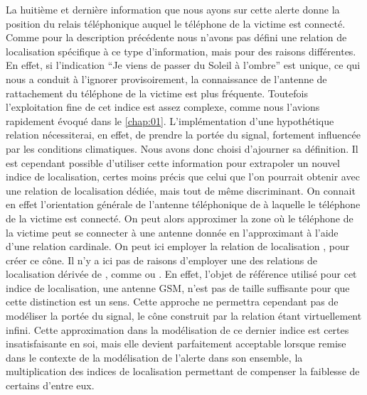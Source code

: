 La huitième et dernière information que nous ayons sur cette alerte
donne la position du relais téléphonique auquel le téléphone de la
victime est connecté. Comme pour la description précédente nous
n'avons pas défini une relation de localisation spécifique à ce type
d'information, mais pour des raisons différentes. En effet, si
l’indication \enquote{Je viens de passer du Soleil à l'ombre} est
unique, ce qui nous a conduit à l'ignorer provisoirement, la
connaissance de l'antenne de rattachement du téléphone de la victime
est plus fréquente. Toutefois l'exploitation fine de cet indice est
assez complexe, comme nous l'avions rapidement évoqué dans le
\autoref{chap:01}. L'implémentation d'une hypothétique relation
 nécessiterai, en effet, de prendre la
portée du signal, fortement influencée par les conditions
climatiques. Nous avons donc choisi d'ajourner sa définition. Il est
cependant possible d'utiliser cette information pour extrapoler un
nouvel indice de localisation, certes moins précis que celui que l'on
pourrait obtenir avec une relation de localisation dédiée, mais tout
de même discriminant. On connait en effet l'orientation générale de
l'antenne téléphonique de à laquelle le téléphone de la victime est
connecté. On peut alors approximer la zone où le téléphone de la
victime peut se connecter à une antenne donnée en l'approximant à
l'aide d'une relation cardinale. On peut ici employer la relation de
localisation , pour créer ce cône. Il n'y a
ici pas de raisons d'employer une des relations de localisation
dérivée de , comme
 ou
. En effet, l'objet de référence
utilisé pour cet indice de localisation, une antenne GSM, n'est pas de
taille suffisante pour que cette distinction est un sens. Cette
approche ne permettra cependant pas de modéliser la portée du signal,
le cône construit par la relation  étant
virtuellement infini. Cette approximation dans la modélisation de ce
dernier indice est certes insatisfaisante en soi, mais elle devient
parfaitement acceptable lorsque remise dans le contexte de la
modélisation de l'alerte dans son ensemble, la multiplication des
indices de localisation permettant de compenser la faiblesse de
certains d'entre eux.

